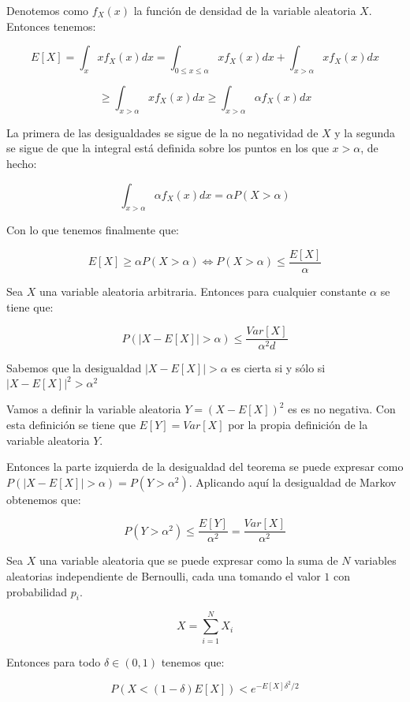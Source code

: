\begin{demostracion}
	Denotemos como $f_{X}(x)$ la función de densidad de la variable aleatoria $X$. Entonces tenemos:
	
	$$E[X] = \int_{x}x f_{X}(x)dx = \int_{0\leq x\leq \alpha}xf_{X}(x)dx + \int_{x>\alpha}xf_{X}(x) dx$$
	
	$$\geq \int_{x>\alpha}xf_{X}(x)dx \geq \int_{x>\alpha}\alpha f_{X}(x)dx$$
	
	La primera de las desigualdades se sigue de la no negatividad de $X$ y la segunda se sigue de que la integral está definida sobre los puntos en los que $x>\alpha$, de hecho:
	
	$$\int_{x>\alpha}\alpha f_{X}(x)dx = \alpha P(X>\alpha)$$
	
	Con lo que tenemos finalmente que:
	
	$$E[X]\geq \alpha P(X>\alpha) \Leftrightarrow P(X>\alpha) \leq \frac{E[X]}{\alpha}$$ \QEDA
\end{demostracion}

\begin{teorema}
	Sea $X$ una variable aleatoria arbitraria. Entonces para cualquier constante $\alpha$ se tiene que:
	
	$$P(|X - E[X]|>\alpha)\leq \frac{Var[X]}{\alpha^2d}$$
\end{teorema}

\begin{demostracion}
	Sabemos que la desigualdad $|X-E[X]|>\alpha$ es cierta si y sólo si $|X-E[X]|^2 > \alpha^2$
	
	Vamos a definir la variable aleatoria $Y = (X-E[X])^2$ es es no negativa. Con esta definición se tiene que $E[Y] = Var[X]$ por la propia definición de la variable aleatoria $Y$.
	
	Entonces la parte izquierda de la desigualdad del teorema se puede expresar como $P(|X - E[X]|>\alpha) = P(Y>\alpha^2)$. Aplicando aquí la desigualdad de Markov obtenemos que:
	
	$$P(Y>\alpha^2) \leq \frac{E[Y]}{\alpha^2} = \frac{Var[X]}{\alpha^2}$$ \QEDA
\end{demostracion}

\begin{teorema}
	Sea $X$ una variable aleatoria que se puede expresar como la suma de $N$ variables aleatorias independiente de Bernoulli, cada una tomando el valor $1$ con probabilidad $p_i$.
	
	$$X = \sum_{i=1}^{N}X_i$$
	
	Entonces para todo $\delta \in (0,1)$ tenemos que:
	
	$$P(X<(1-\delta)E[X])<e^{-E[X]\delta^2 /2}$$
\end{teorema}

